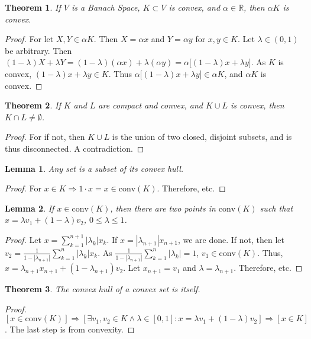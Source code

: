 \documentclass[crop=false,class=book]{standalone}
\theoremstyle{mystyle}
\newtheorem{theorem}{Theorem}[section]
\newtheorem{lemma}{Lemma}[section]
\begin{document}
\begin{theorem}
If $V$ is a Banach Space, $K\subset V$ is convex, and $\alpha \in \mathbb{R}$, then $\alpha K$ is convex.
\end{theorem}
\begin{proof}
For let $X,Y\in \alpha K$. Then $X = \alpha x$ and $Y = \alpha y$ for $x,y\in K$. Let $\lambda \in (0,1)$ be arbitrary. Then $(1-\lambda)X+\lambda Y =(1-\lambda)(\alpha x)+\lambda (\alpha y) = \alpha\big[(1-\lambda)x+\lambda y\big]$. As $K$ is convex, $(1-\lambda)x+\lambda y \in K$. Thus $\alpha\big[(1-\lambda)x+\lambda y\big] \in \alpha K$, and $\alpha K$ is convex.
\end{proof}
\begin{theorem}
If $K$ and $L$ are compact and convex, and $K\cup L$ is convex, then $K\cap L \ne \emptyset$.
\end{theorem}
\begin{proof}
For if not, then $K\cup L$ is the union of two closed, disjoint subsets, and is thus disconnected. A contradiction. 
\end{proof}
\begin{lemma}
Any set is a subset of its convex hull.
\end{lemma}
\begin{proof}
For $x\in K \Rightarrow 1\cdot x=x \in \textrm{conv}(K)$. Therefore, etc.
\end{proof}
\begin{lemma}
If $x\in \textrm{conv}(K)$, then there are two points in $\textrm{conv}(K)$ such that $x = \lambda v_1 +(1- \lambda) v_2$, $0 \leq \lambda \leq 1$.
\end{lemma}
\begin{proof}
Let $x=\sum_{k=1}^{n+1}|\lambda_k| x_k$. If $x=|\lambda_{n+1}|x_{n+1}$, we are done. If not, then let $v_2 = \frac{1}{1-|\lambda_{n+1}|}\sum_{k=1}^{n}|\lambda_k|x_k$. As $\frac{1}{1-|\lambda_{n+1}|}\sum_{k=1}^{n}|\lambda_k| = 1$, $v_1\in \textrm{conv}(K)$. Thus, $x = \lambda_{n+1}x_{n+1}+(1-\lambda_{n+1})v_2$. Let $x_{n+1}=v_1$ and $\lambda = \lambda_{n+1}$. Therefore, etc.
\end{proof}
\begin{theorem}
The convex hull of a convex set is itself.
\end{theorem}
\begin{proof}
$[x\in \textrm{conv}(K)]\Rightarrow [\exists v_1,v_2\in K\land \lambda\in[0,1]:x=\lambda v_1+(1-\lambda)v_2]\Rightarrow [x\in K]$. The last step is from convexity.
\end{proof}
\end{document}
